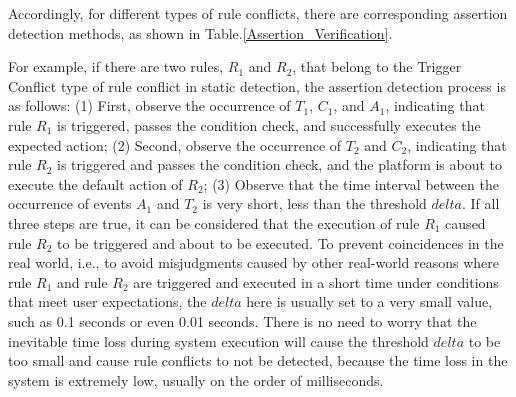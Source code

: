 Accordingly, for different types of rule conflicts, there are corresponding assertion detection methods, as shown in Table.\ref{Assertion_Verification}.

For example, if there are two rules, $R_1$ and $R_2$, that belong to the Trigger Conflict type of rule conflict in static detection, the assertion detection process is as follows: (1) First, observe the occurrence of $T_1$, $C_1$, and $A_1$, indicating that rule $R_1$ is triggered, passes the condition check, and successfully executes the expected action; (2) Second, observe the occurrence of $T_2$ and $C_2$, indicating that rule $R_2$ is triggered and passes the condition check, and the platform is about to execute the default action of $R_2$; (3) Observe that the time interval between the occurrence of events $A_1$ and $T_2$ is very short, less than the threshold $delta$. If all three steps are true, it can be considered that the execution of rule $R_1$ caused rule $R_2$ to be triggered and about to be executed. To prevent coincidences in the real world, i.e., to avoid misjudgments caused by other real-world reasons where rule $R_1$ and rule $R_2$ are triggered and executed in a short time under conditions that meet user expectations, the $delta$ here is usually set to a very small value, such as 0.1 seconds or even 0.01 seconds. There is no need to worry that the inevitable time loss during system execution will cause the threshold $delta$ to be too small and cause rule conflicts to not be detected, because the time loss in the system is extremely low, usually on the order of milliseconds.

